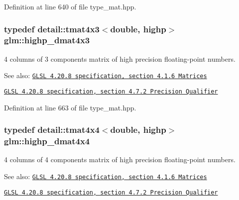 Definition at line 640 of file type\_\-mat.hpp.\hypertarget{group__core__precision_gf8aeba0eecc5c651e0f06414b6e37754}{
\subsubsection[highp\_\-dmat4x3]{\setlength{\rightskip}{0pt plus 5cm}typedef detail::tmat4x3$<$double, highp$>$ {\bf glm::highp\_\-dmat4x3}}}
\label{group__core__precision_gf8aeba0eecc5c651e0f06414b6e37754}


4 columns of 3 components matrix of high precision floating-point numbers.

\begin{Desc}
\item[See also:]\href{http://www.opengl.org/registry/doc/GLSLangSpec.4.20.8.pdf}{\tt GLSL 4.20.8 specification, section 4.1.6 Matrices} 

\href{http://www.opengl.org/registry/doc/GLSLangSpec.4.20.8.pdf}{\tt GLSL 4.20.8 specification, section 4.7.2 Precision Qualifier} \end{Desc}


Definition at line 663 of file type\_\-mat.hpp.\hypertarget{group__core__precision_g1c0a2edbde597b59e9005691a224b208}{
\subsubsection[highp\_\-dmat4x4]{\setlength{\rightskip}{0pt plus 5cm}typedef detail::tmat4x4$<$double, highp$>$ {\bf glm::highp\_\-dmat4x4}}}
\label{group__core__precision_g1c0a2edbde597b59e9005691a224b208}


4 columns of 4 components matrix of high precision floating-point numbers.

\begin{Desc}
\item[See also:]\href{http://www.opengl.org/registry/doc/GLSLangSpec.4.20.8.pdf}{\tt GLSL 4.20.8 specification, section 4.1.6 Matrices} 

\href{http://www.opengl.org/registry/doc/GLSLangSpec.4.20.8.pdf}{\tt GLSL 4.20.8 specification, section 4.7.2 Precision Qualifier} \end{Desc}


